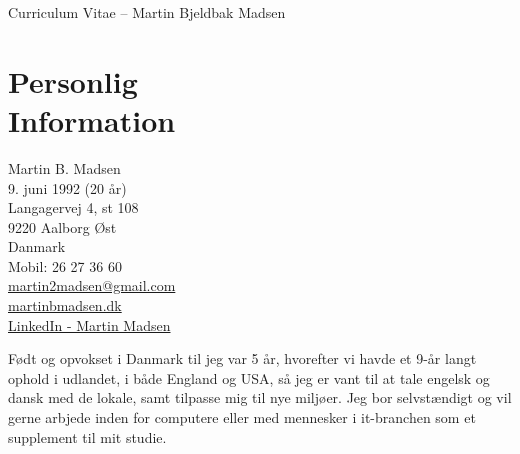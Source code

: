 \documentclass[margin,line,a4paper]{resume}
\begin{document}
\raggedright
{\sc \Large Curriculum Vitae -- Martin Bjeldbak Madsen}
\begin{resume}
    \vspace{0.5cm}
    \begin{figure}
         \vspace{-1cm}
        \begin{center}
        \end{center}
         \vspace{-2cm}
    \end{figure}

    \section{\mysidestyle Personlig\\Information}%
    Martin B. Madsen\\
    9. juni 1992 (20 år)\\ 
    Langagervej 4, st 108\\
    9220 Aalborg Øst\\
    Danmark\\
    Mobil: 26 27 36 60\\
    \href{mailto:martin2madsen@gmail.com}{martin2madsen@gmail.com}\\
    \href{http://www.martinbmadsen.dk}{martinbmadsen.dk}\\
    \href{http://dk.linkedin.com/pub/martin-madsen/21/9b0/b0}{LinkedIn - Martin Madsen}\vspace{1cm}

    Født og opvokset i Danmark til jeg var 5 år, hvorefter vi havde et
    9-år langt ophold i udlandet, i både England og USA, så jeg er vant til
    at tale engelsk og dansk med de lokale, samt tilpasse mig til nye miljøer. Jeg
    bor selvstændigt og vil gerne arbjede inden for computere eller med mennesker i it-branchen som et supplement til mit studie.


\end{resume}
\end{document}
